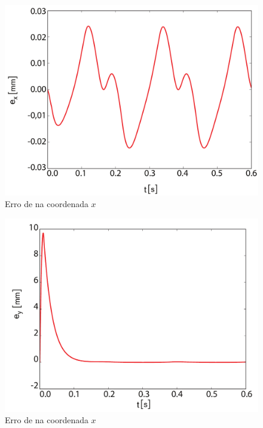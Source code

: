 \documentclass[]{politex}
\begin{document}
\begin{multicols}{2}
\begin{figure}[H]
	\centering
	\includegraphics[scale=0.31]{../figures/ex2.pdf}  
	\caption{Erro de na coordenada $x$}
	\label{fig:ex2}
\end{figure}

\begin{figure}[H]
	\centering
	\includegraphics[scale=0.31]{../figures/ey2.pdf}  
	\caption{Erro de na coordenada $x$}
	\label{fig:ey2}
\end{figure}
\end{multicols}
\end{document}
